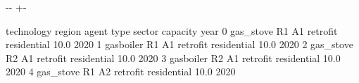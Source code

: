 \documentclass[letterpaper,10pt,english]{sphinxmanual}
\newlength\nbsphinxcodecellspacing
\begin{document}
{

\kern-\sphinxverbatimsmallskipamount\kern-\baselineskip
\kern+\FrameHeightAdjust\kern-\fboxrule
\vspace{\nbsphinxcodecellspacing}

\begin{sphinxVerbatim}[commandchars=\\\{\}]
\llap{\color{nbsphinxout}[3]:\,\hspace{\fboxrule}\hspace{\fboxsep}}  technology region agent      type       sector  capacity  year
0  gas\_stove     R1    A1  retrofit  residential      10.0  2020
1  gasboiler     R1    A1  retrofit  residential      10.0  2020
2  gas\_stove     R2    A1  retrofit  residential      10.0  2020
3  gasboiler     R2    A1  retrofit  residential      10.0  2020
4  gas\_stove     R1    A2  retrofit  residential      10.0  2020
\end{sphinxVerbatim}
}
\end{document}
